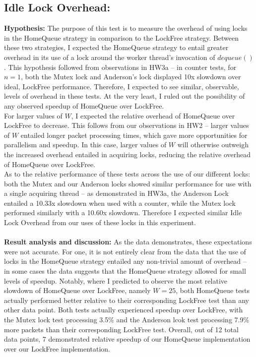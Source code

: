 \documentclass[]{article}
\begin{document}
\subsection{Idle Lock Overhead:}
\textbf{Hypothesis:}
The purpose of this test is to measure the overhead of using locks in the HomeQueue strategy in comparison to the LockFree strategy. Between these two strategies, I expected the HomeQueue strategy to entail greater overhead in its use of a lock around the worker thread's invocation of $dequeue()$. This hypothesis followed from  observations in HW3a -- in counter tests, for $n = 1$, both the Mutex lock and Anderson's lock displayed 10x slowdown over ideal, LockFree performance. Therefore, I expected to see similar, observable, levels of overhead in these tests. At the very least, I ruled out the possibility of any observed speedup of HomeQueue over LockFree. 
\\
For larger values of $W$, I expected the relative overhead of HomeQueue over LockFree to decrease. This follows from our observations in HW2 -- larger values of $W$ entailed longer packet processing times, which gave more opportunities for parallelism and speedup. In this case, larger values of $W$ will otherwise outweigh the increased overhead entailed in acquiring locks, reducing the relative overhead of HomeQueue over LockFree.
\\
As to the relative performance of these tests across the use of our different locks: both the Mutex and our Anderson locks showed similar performance for use with a single acquiring thread -- as demonstrated in HW3a, the Anderson Lock entailed a 10.33x slowdown when used with a counter, while the Mutex lock performed similarly with a 10.60x slowdown. Therefore I expected similar Idle Lock Overhead from our uses of these locks in this experiment.
\\\\
\textbf{Result analysis and discussion:}
As the data demonstrates, these expectations were not accurate. For one, it is not entirely clear from the data that the use of locks in the HomeQueue strategy entailed any non-trivial amount of overhead -- in some cases the data suggests that the HomeQueue strategy allowed for small levels of speedup. Notably, where I predicted to observe the most relative slowdown of HomeQueue over LockFree, namely $W = 25$,  both HomeQueue tests actually performed better relative to their corresponding LockFree test than any other data point. Both tests actually experienced speedup over LockFree, with the Mutex lock test processing 3.5\% and the Anderson lcok test processing 7.9\% more packets than their corresponding LockFree test. Overall, out of 12 total data points, 7 demonstrated relative speedup of our HomeQueue implementation over our LockFree implementation.
\end{document}
